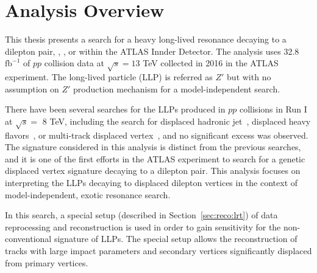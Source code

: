 \chapter{Analysis Overview}
\label{chap:analysis_overview}

This thesis presents a search for a heavy long-lived resonance decaying to a dilepton pair, \mumu, \ee, or \emu within the ATLAS Innder Detector. The analysis uses 32.8 $\mathrm{fb^{-1}}$ of $pp$ collision data at $\sqrt{s}=13$ TeV collected in 2016 in the ATLAS experiment. The long-lived particle (LLP) is referred as $Z'$ but with no assumption on $Z'$ production mechanism for a model-independent search.

There have been several searches for the LLPs produced in $pp$ collisions in Run I at $\sqrt{s} =$ 8 TeV, including the search for displaced hadronic jet~\cite{Blackburn:1550730}, displaced heavy flavors~\cite{Harris:1512932}, or multi-track displaced vertex~\cite{Aad:2015rba}, and no significant excess was observed. The signature considered in this analysis is distinct from the previous searches, and it is one of the first efforts in the ATLAS experiment to search for a genetic displaced vertex signature decaying to a dilepton pair. This analysis focuses on interpreting the LLPs decaying to displaced dilepton vertices in the context of model-independent, exotic resonance search.

In this search, a special setup (described in Section~\ref{sec:reco:lrt}) of data reprocessing and reconstruction is used in order to gain sensitivity for the non-conventional signature of LLPs. The special setup allows the reconstruction of tracks with large impact parameters and secondary vertices significantly displaced from primary vertices. 
